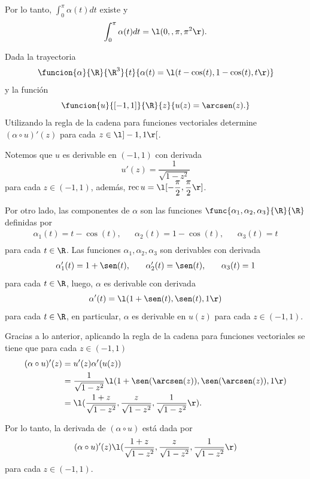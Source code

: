 \documentclass[a4,11pt]{aleph-examen}
\begin{document}
\begin{preguntas}
\begin{respuesta}
    Por lo tanto, $\int_0^{\pi} \alpha(t) dt$ existe y 
    \[
        \int_0^{\pi} \alpha(t) dt=\l(0,,\pi,\pi^2\r).
    \]
\end{respuesta}

\item Dada la trayectoria
\[
\funcion{\alpha}{\R}{\R^3}
{t}{\alpha(t)=\l(t-\cos(t),1-\cos(t),t\r)}
\]
y la función
\[
\funcion{u}{[-1,1]}{\R}
{z}{u(z)=\arcsen(z).}
\]
Utilizando la regla de la cadena para funciones vectoriales determine $(\alpha \circ u)'(z)$ para cada $z\in \l] -1,1 \r[$.

\begin{respuesta}
Notemos que $u$ es derivable en $(-1,1)$ con derivada
\[
    u'(z) = \dfrac{1}{\sqrt{1-z^2}}
\]
para cada $z\in(-1,1)$, además, $\mbox{rec}\,u= \l[-\dfrac{\pi}{2},\dfrac{\pi}{2}\r]$.

Por otro lado, las componentes de $\alpha$ son las funciones $\func{\alpha_1,\alpha_2,\alpha_3}{\R}{\R}$ definidas por
\[
\begin{array}{ccccc}
    \alpha_1(t) = t-\cos(t), & &  \alpha_2(t)=1-\cos(t), & & \alpha_3(t)=t\\
\end{array}
\]
para cada $t\in\R$. Las funciones $\alpha_1,\alpha_2,\alpha_3$ son derivables con derivada
\[
\begin{array}{ccccc}
    \alpha'_1(t) = 1+\sen(t), & &  \alpha'_2(t)=\sen(t), & & \alpha_3(t)=1\\
\end{array}
\]
para cada $t\in\R$, luego, $\alpha$ es derivable con derivada 
\[
\alpha'(t) = \l(1+\sen(t),\sen(t),1\r)
\]
para cada $t\in\R$, en particular, $\alpha$ es derivable en $u(z)$ para cada $z\in(-1,1)$.

Gracias a lo anterior, aplicando la regla de la cadena para funciones vectoriales se tiene que para cada $z\in (-1,1)$
\begin{align*}
    (\alpha \circ u)'(z) &= u'(z)\alpha'(u(z))\\
                         &= \dfrac{1}{\sqrt{1-z^2}}\l(1+\sen(\arcsen(z)),\sen(\arcsen(z)),1\r)\\
                         &= \l(\dfrac{1+z}{\sqrt{1-z^2}},\dfrac{z}{\sqrt{1-z^2}},\dfrac{1}{\sqrt{1-z^2}}\r).
\end{align*}

Por lo tanto, la derivada de $(\alpha \circ u)$ está dada por
\[
    (\alpha \circ u)'(z) \l(\dfrac{1+z}{\sqrt{1-z^2}},\dfrac{z}{\sqrt{1-z^2}},\dfrac{1}{\sqrt{1-z^2}}\r)
\]
para cada $z\in(-1,1)$.
\end{respuesta}



\end{preguntas}
\end{document}
